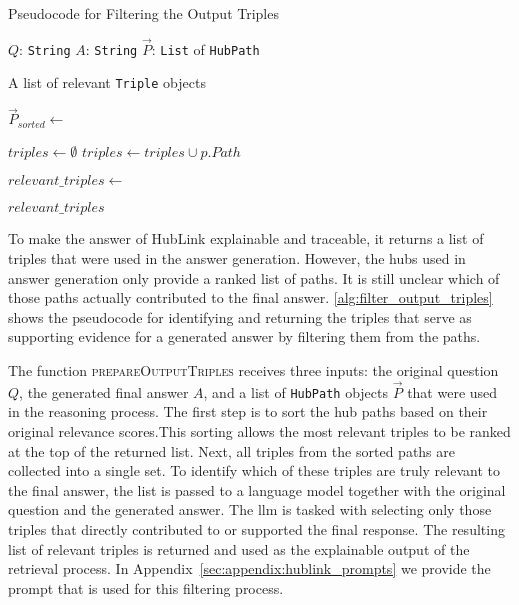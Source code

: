\begin{algorithm}[t]
\caption{Pseudocode for Filtering the Output Triples}
\label{alg:filter_output_triples}
\begin{algorithmic}[1]
\Require
    \Statex $Q$: \texttt{String} 
    \Statex $A$: \texttt{String} 
    \Statex $\vec{P}$: \texttt{List} of \texttt{HubPath} 

\Ensure
    \Statex A list of relevant \texttt{Triple} objects
\Statex

    \State $\vec{P}_{sorted} \gets$ 
    
    \State $triples \gets \emptyset$
        \State $triples \gets triples \cup p.Path$
    \EndFor

    \State $relevant\_triples \gets$ 
    
    \State \Return $relevant\_triples$
\EndFunction
\end{algorithmic}
\end{algorithm}

To make the answer of HubLink explainable and traceable, it returns a list of triples that were used in the answer generation. However, the hubs used in answer generation only provide a ranked list of paths. It is still unclear which of those paths actually contributed to the final answer. \autoref{alg:filter_output_triples} shows the pseudocode for identifying and returning the triples that serve as supporting evidence for a generated answer by filtering them from the paths.

The function \textsc{prepareOutputTriples} receives three inputs: the original question \(Q\), the generated final answer \(A\), and a list of \texttt{HubPath} objects \(\vec{P}\) that were used in the reasoning process. The first step is to sort the hub paths based on their original relevance scores.This sorting allows the most relevant triples to be ranked at the top of the returned list. Next, all triples from the sorted paths are collected into a single set. To identify which of these triples are truly relevant to the final answer, the list is passed to a language model together with the original question and the generated answer. The \gls{llm} is tasked with selecting only those triples that directly contributed to or supported the final response. The resulting list of relevant triples is returned and used as the explainable output of the retrieval process. In Appendix~\ref{sec:appendix:hublink_prompts} we provide the prompt that is used for this filtering process.

